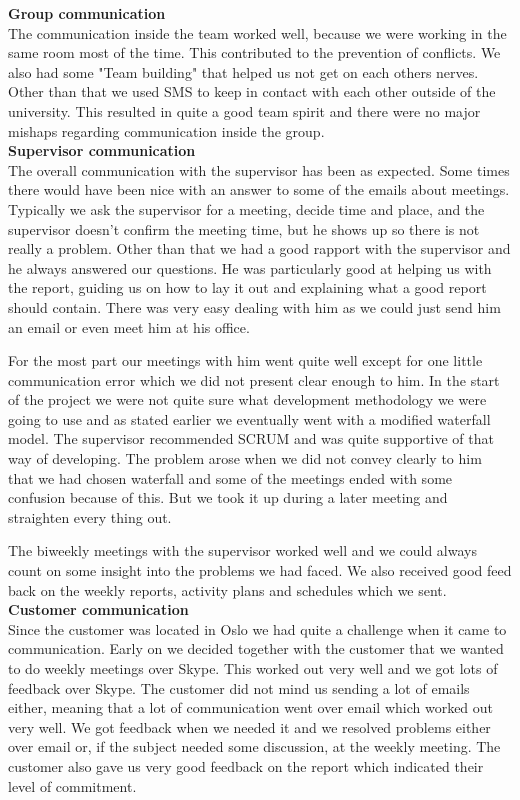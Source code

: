 
\indent \indent \textbf{Group communication} \\
The communication inside the team worked well, because we were working in the same room most of the time. This contributed to the prevention of conflicts. We also had some "Team building" that helped us not get on each others nerves. Other than that we used SMS to keep in contact with each other outside of the university. This resulted in quite a good team spirit and there were no major mishaps regarding communication inside the group.
\\

\textbf{Supervisor communication} \\
The overall communication with the supervisor has been as expected. Some times there would have been nice with an answer to some of the emails about meetings. Typically we ask the supervisor for a meeting, decide time and place, and the supervisor doesn't confirm the meeting time, but he shows up so there is not really a problem. Other than that we had a good rapport with the supervisor and he always answered our questions. He was particularly good at helping us with the report, guiding us on how to lay it out and explaining what a good report should contain. There was very easy dealing with him as we could just send him an email or even meet him at his office.

For the most part our meetings with him went quite well except for one little communication error which we did not present clear enough to him. In the start of the project we were not quite sure what development methodology we were going to use and as stated earlier we eventually went with a modified waterfall model. The supervisor recommended SCRUM and was quite supportive of that way of developing. The problem arose when we did not convey clearly to him that we had chosen waterfall and some of the meetings ended with some confusion because of this. But we took it up during a later meeting and straighten every thing out.

The biweekly meetings with the supervisor worked well and we could always count on some insight into the problems we had faced. We also received good feed back on the weekly reports, activity plans and schedules which we sent.
\\ 

\textbf{Customer communication} \\
Since the customer was located in Oslo we had quite a challenge when it came to communication. Early on we decided together with the customer that we wanted to do weekly meetings over Skype. This worked out very well and we got lots of feedback over Skype. The customer did not mind us sending a lot of emails either, meaning that a lot of communication went over email which worked out very well. We got feedback when we needed it and we resolved problems either over email or, if the subject needed some discussion, at the weekly meeting. The customer also gave us very good feedback on the report which indicated their level of commitment. 

